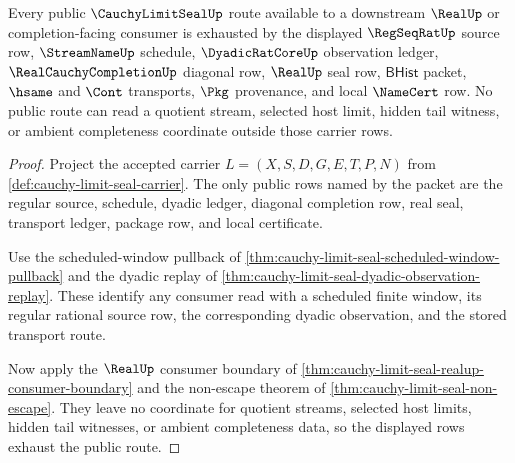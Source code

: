 \begin{theorem}
\label{thm:cauchy-limit-seal-public-route-exhaustion}
Every public $\CauchyLimitSealUp$ route available to a downstream $\RealUp$ or completion-facing consumer is exhausted by the displayed $\RegSeqRatUp$ source row, $\StreamNameUp$ schedule, $\DyadicRatCoreUp$ observation ledger, $\RealCauchyCompletionUp$ diagonal row, $\RealUp$ seal row, $\mathsf{BHist}$ packet, $\hsame$ and $\Cont$ transports, $\Pkg$ provenance, and local $\NameCert$ row. No public route can read a quotient stream, selected host limit, hidden tail witness, or ambient completeness coordinate outside those carrier rows.
\end{theorem}
\begin{proof}
Project the accepted carrier $L=(X,S,D,G,E,T,P,N)$ from \autoref{def:cauchy-limit-seal-carrier}. The only public rows named by the packet are the regular source, schedule, dyadic ledger, diagonal completion row, real seal, transport ledger, package row, and local certificate.

Use the scheduled-window pullback of \autoref{thm:cauchy-limit-seal-scheduled-window-pullback} and the dyadic replay of \autoref{thm:cauchy-limit-seal-dyadic-observation-replay}. These identify any consumer read with a scheduled finite window, its regular rational source row, the corresponding dyadic observation, and the stored transport route.

Now apply the $\RealUp$ consumer boundary of \autoref{thm:cauchy-limit-seal-realup-consumer-boundary} and the non-escape theorem of \autoref{thm:cauchy-limit-seal-non-escape}. They leave no coordinate for quotient streams, selected host limits, hidden tail witnesses, or ambient completeness data, so the displayed rows exhaust the public route.
\end{proof}

